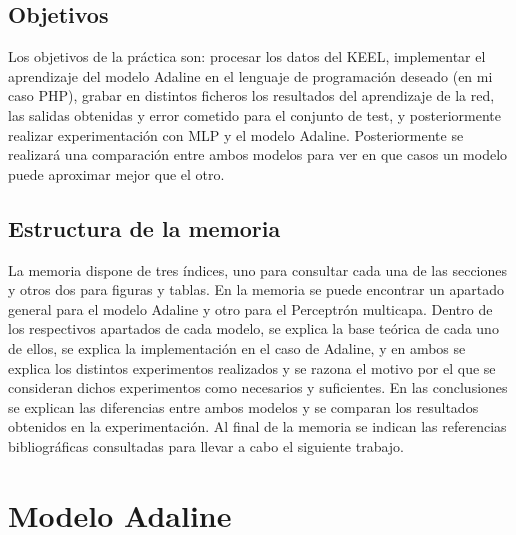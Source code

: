 \documentclass[11pt,spanish,listoffigures,listoftables]{tfgetsinf}
\begin{document}
\section{Objetivos}

\par Los objetivos de la práctica son: procesar los datos del KEEL\cite{KEEL}, implementar el aprendizaje del modelo Adaline en el lenguaje de programación deseado (en mi caso PHP), grabar en distintos ficheros los resultados del aprendizaje de la red, las salidas obtenidas y error cometido para el conjunto de test, y posteriormente realizar experimentación con MLP y el modelo Adaline. Posteriormente se realizará una comparación entre ambos modelos para ver en que casos un modelo puede aproximar mejor que el otro.

\section{Estructura de la memoria}

\par La memoria dispone de tres índices, uno para consultar cada una de las secciones y otros dos para figuras y tablas. En la memoria se puede encontrar un apartado general para el modelo Adaline y otro para el Perceptrón multicapa. Dentro de los respectivos apartados de cada modelo, se explica la base teórica de cada uno de ellos, se explica la implementación en el caso de Adaline, y en ambos se explica los distintos experimentos realizados y se razona el motivo por el que se consideran dichos experimentos como necesarios y suficientes. En las conclusiones se explican las diferencias entre ambos modelos y se comparan los resultados obtenidos en la experimentación. Al final de la memoria se indican las referencias bibliográficas consultadas para llevar a cabo el siguiente trabajo.




\chapter{Modelo Adaline}
\end{document}
